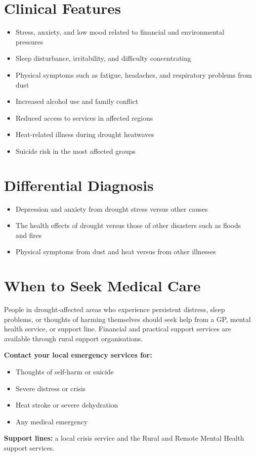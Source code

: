 \section*{Clinical Features}
\begin{itemize}
    \item Stress, anxiety, and low mood related to financial and environmental pressures
    \item Sleep disturbance, irritability, and difficulty concentrating
    \item Physical symptoms such as fatigue, headaches, and respiratory problems from dust
    \item Increased alcohol use and family conflict
    \item Reduced access to services in affected regions
    \item Heat-related illness during drought heatwaves
    \item Suicide risk in the most affected groups
\end{itemize}

\section*{Differential Diagnosis}
\begin{itemize}
    \item Depression and anxiety from drought stress versus other causes
    \item The health effects of drought versus those of other disasters such as floods and fires
    \item Physical symptoms from dust and heat versus from other illnesses
\end{itemize}

\section*{When to Seek Medical Care}
People in drought-affected areas who experience persistent distress, sleep problems, or thoughts of harming themselves should seek help from a GP, mental health service, or support line. Financial and practical support services are available through rural support organisations.

\textbf{Contact your local emergency services for:}
\begin{itemize}
    \item Thoughts of self-harm or suicide
    \item Severe distress or crisis
    \item Heat stroke or severe dehydration
    \item Any medical emergency
\end{itemize}
\textbf{Support lines:} a local crisis service and the Rural and Remote Mental Health support services.

